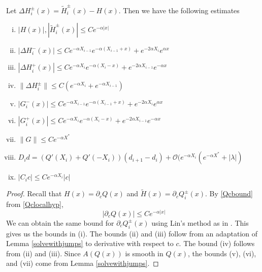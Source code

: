 \documentclass[thesis.tex]{subfiles}
\begin{document}
\begin{lemma}\label{stabestimateslemma}
Let $\Delta H_i^\pm(x) = \tilde{H}_i^\pm(x) - H(x)$. Then we have the following estimates
\begin{enumerate}[(i)]
\item $|H(x)|, |\tilde{H}_i^\pm(x)| \leq C e^{-\alpha |x|}$
\item $|\Delta H_i^-(x)| \leq C e^{-\alpha X_{i-1}} e^{-\alpha(X_{i-1} + x) } + e^{-2 \alpha X_i} e^{\alpha x}$
\item $|\Delta H_i^+(x)| \leq C e^{-\alpha X_i} e^{-\alpha(X_i - x) } + e^{-2 \alpha X_{i-1}} e^{-\alpha x}$
\item $\|\Delta H_i^\pm\| \leq C(e^{-\alpha X_i} + e^{-\alpha X_{i-1}} )$
\item $|G_i^-(x)| \leq C e^{-\alpha X_{i-1}} e^{-\alpha(X_{i-1} + x) } + e^{-2 \alpha X_i} e^{\alpha x}$
\item $|G_i^+(x)| \leq C e^{-\alpha X_i} e^{-\alpha(X_i - x) } + e^{-2 \alpha X_{i-1}} e^{-\alpha x}$
\item $\|G\| \leq C e^{-\alpha X^*}$
\item $D_i d = ( Q'(X_i) + Q'(-X_i))(d_{i+1} - d_i ) + \mathcal{O} ( e^{-\alpha X_i} (e^{-\alpha X^*} + |\lambda| )$
\item $|C_i c| \leq C e^{-\alpha X_i} |c|$
\end{enumerate}
\begin{proof}
Recall that $H(x) = \partial_c Q(x)$ and $\tilde{H}(x) = \partial_c Q_i^\pm(x)$. By \cref{Qcbound} from \cref{Qclocalhyp},
\begin{equation}\label{Qcbound1}
|\partial_c Q(x)| \leq C e^{-\alpha|x|}
\end{equation}
We can obtain the same bound for $\partial_c Q_i^\pm(x)$ using Lin's method as in \cite{SandstedeStrut,Sandstede1993}. This gives us the bounds in (i). The bounds (ii) and (iii) follow from an adaptation of Lemma \ref{solvewithjumps} to derivative with respect to $c$. The bound (iv) follows from (ii) and (iii). Since $A(Q(x))$ is smooth in $Q(x)$, the bounds (v), (vi), and (vii) come from Lemma \ref{solvewithjumps}. 


\end{proof}
\end{lemma}
\end{document}

